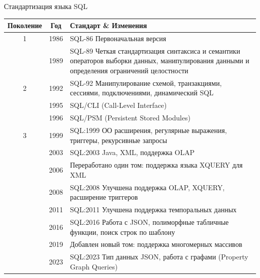 \documentclass[a4paper,12pt]{article}
\begin{document}
Стандартизация языка SQL  
\\
\begin{tabular}{c|c|l}
Поколение & Год & Стандарт \& Изменения \\ \hline
1 & 1986 & SQL-86 Первоначальная версия \\ 
  & 1989 & SQL-89 Четкая стандартизация синтаксиса и семантики операторов выборки данных, манипулирования данными и определения ограничений целостности \\
2 & 1992 & SQL-92 Манипулирование схемой, транзакциями, сессиями, подключениями, динамический SQL \\
  & 1995 & SQL/CLI (Call-Level Interface) \\
  & 1996 & SQL/PSM (Persistent Stored Modules) \\
3 & 1999 & SQL:1999 ОО расширения, регулярные выражения, триггеры, рекурсивные запросы \\
  & 2003 & SQL:2003 Java, XML, поддержка OLAP \\
  & 2006 & Переработано один том: поддержка языка XQUERY для XML \\
  & 2008 & SQL:2008 Улучшена поддержка OLAP, XQUERY, расширение триггеров \\
  & 2011 & SQL:2011 Улучшена поддержка темпоральных данных \\
  & 2016 & SQL:2016 Работа с JSON, полиморфные табличные функции, поиск строк по шаблону \\
  & 2019 & Добавлен новый том: поддержка многомерных массивов \\
  & 2023 & SQL:2023 Тип данных JSON, работа с графами (Property Graph Queries)
\end{tabular}
\end{document}
